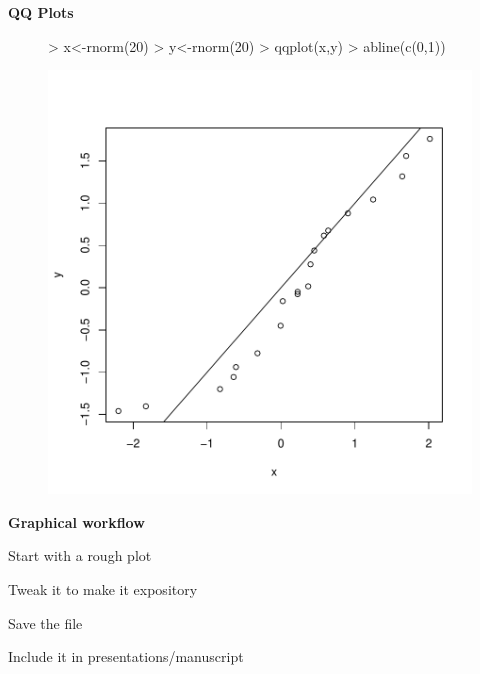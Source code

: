 \documentclass[xcolor=dvipsnames , 11pt]{beamer}
\begin{document}
\begin{frame}[fragile]{\textbf{QQ Plots}}

\begin{center}
\begin{figure}
\centering
\begin{Schunk}
\begin{Sinput}
> x<-rnorm(20)
> y<-rnorm(20)
> qqplot(x,y)
> abline(c(0,1))
\end{Sinput}
\end{Schunk}
\includegraphics{day3_lesson1_graphs_presentation-008}
\end{figure}
\end{center}

\end{frame}

\begin{frame}{\textbf{Graphical workflow}}

\begin{itemize}
\begin{pause}
\item{Start with a rough plot}
\end{pause}
\begin{pause}
\item{Tweak it to make it expository}
\end{pause}
\begin{pause}
\item{Save the file}
\end{pause}
\begin{pause}
\item{Include it in presentations/manuscript}
\end{pause}
\end{itemize}
\end{frame}
\end{document}
